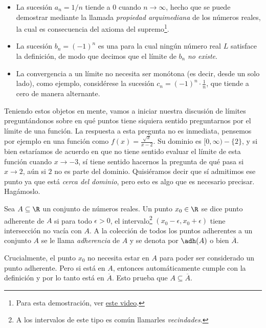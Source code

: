 \begin{example}
    \begin{itemize}
        \item La sucesión $a_n = 1/n$ tiende a $0$ cuando $n \to \infty$, hecho que se puede demostrar mediante la llamada \textit{propiedad arquimediana} de los números reales, la cual es consecuencia del axioma del supremo\footnote{Para esta demostración, ver \href{https://youtu.be/pyAIT1eZBas}{este video}.}.
        \item La sucesión $b_n = (-1)^n$ es una para la cual ningún número real $L$ satisface la definición, de modo que decimos que el límite de $b_n$ \textit{no existe}.
        \item La convergencia a un límite no necesita ser monótona (es decir, desde un solo lado), como ejemplo, considérese la sucesión $c_n = (-1)^n \cdot \frac{1}{n}$, que tiende a cero de manera alternante.
    \end{itemize}
\end{example}

Teniendo estos objetos en mente, vamos a iniciar nuestra discusión de límites preguntándonos sobre en qué puntos tiene siquiera sentido preguntarnos por el límite de una función. La respuesta a esta pregunta no es inmediata, pensemos por ejemplo en una función como $f(x) = \frac{\sqrt{x}}{x - 2}$. Su dominio es $[0, \infty) - \{2\}$, y si bien estaríamos de acuerdo en que no tiene sentido evaluar el límite de esta función cuando $x \to -3$, sí tiene sentido hacernos la pregunta de qué pasa si $x \to 2$, aún si $2$ no es parte del dominio. Quisiéramos decir que sí admitimos ese punto ya que está \textit{cerca del dominio}, pero esto es algo que es necesario precisar. Hagámoslo.

\begin{definition}[Adherencia]
    Sea $A \subseteq \R$ un conjunto de números reales. Un punto $x_0 \in \R$ se dice punto adherente de $A$ si para todo $\epsilon > 0$, el intervalo\footnote{A los intervalos de este tipo es común llamarles \textit{vecindades}.} $(x_0 - \epsilon, x_0 + \epsilon)$ tiene intersección no vacía con $A$. A la colección de todos los puntos adherentes a un conjunto $A$ se le llama \textit{adherencia} de $A$ y se denota por $\adh(A)$ o bien $\overline{A}$.
\end{definition}

\begin{remark}
    Crucialmente, el punto $x_0$ no necesita estar en $A$ para poder ser considerado un punto adherente. Pero si está en $A$, entonces automáticamente cumple con la definición y por lo tanto está en $\overline{A}$. Esto prueba que $A \subseteq \overline{A}$.
\end{remark}

